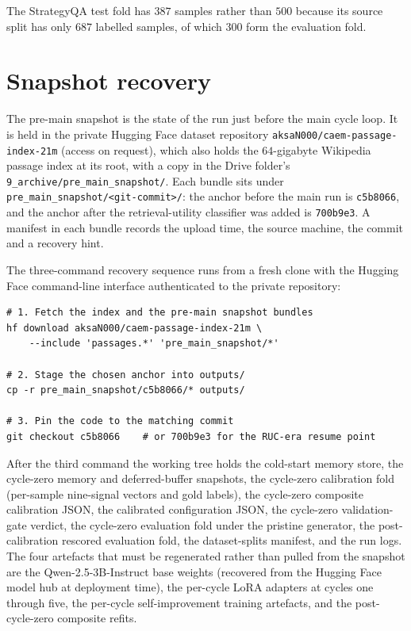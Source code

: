 The StrategyQA test fold has $387$ samples rather than $500$ because its source split has only $687$ labelled samples, of which $300$ form the evaluation fold.

\section{Snapshot recovery}
\label{app:repro-snapshot}

The pre-main snapshot is the state of the run just before the main cycle loop. It is held in the private Hugging Face dataset repository \verb|aksaN000/caem-passage-index-21m| (access on request), which also holds the $64$-gigabyte Wikipedia passage index at its root, with a copy in the Drive folder's \texttt{9\_archive/pre\_main\_snapshot/}. Each bundle sits under \verb|pre_main_snapshot/<git-commit>/|: the anchor before the main run is \verb|c5b8066|, and the anchor after the retrieval-utility classifier was added is \verb|700b9e3|. A manifest in each bundle records the upload time, the source machine, the commit and a recovery hint.

The three-command recovery sequence runs from a fresh clone with the Hugging Face command-line interface authenticated to the private repository:
\begin{verbatim}
# 1. Fetch the index and the pre-main snapshot bundles
hf download aksaN000/caem-passage-index-21m \
    --include 'passages.*' 'pre_main_snapshot/*'

# 2. Stage the chosen anchor into outputs/
cp -r pre_main_snapshot/c5b8066/* outputs/

# 3. Pin the code to the matching commit
git checkout c5b8066    # or 700b9e3 for the RUC-era resume point
\end{verbatim}
After the third command the working tree holds the cold-start memory store, the cycle-zero memory and deferred-buffer snapshots, the cycle-zero calibration fold (per-sample nine-signal vectors and gold labels), the cycle-zero composite calibration JSON, the calibrated configuration JSON, the cycle-zero validation-gate verdict, the cycle-zero evaluation fold under the pristine generator, the post-calibration rescored evaluation fold, the dataset-splits manifest, and the run logs. The four artefacts that must be regenerated rather than pulled from the snapshot are the Qwen-2.5-3B-Instruct base weights (recovered from the Hugging Face model hub at deployment time), the per-cycle LoRA adapters at cycles one through five, the per-cycle self-improvement training artefacts, and the post-cycle-zero composite refits.


